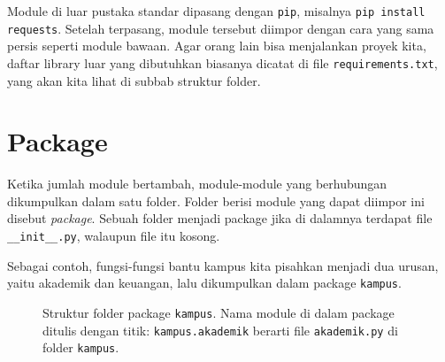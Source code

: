 Module di luar pustaka standar dipasang dengan \texttt{pip}, misalnya \texttt{pip install requests}. Setelah terpasang, module tersebut diimpor dengan cara yang sama persis seperti module bawaan. Agar orang lain bisa menjalankan proyek kita, daftar library luar yang dibutuhkan biasanya dicatat di file \texttt{requirements.txt}, yang akan kita lihat di subbab struktur folder.

\section{Package}

Ketika jumlah module bertambah, module-module yang berhubungan dikumpulkan dalam satu folder. Folder berisi module yang dapat diimpor ini disebut \emph{package}. Sebuah folder menjadi package jika di dalamnya terdapat file \texttt{\_\_init\_\_.py}, walaupun file itu kosong.

Sebagai contoh, fungsi-fungsi bantu kampus kita pisahkan menjadi dua urusan, yaitu akademik dan keuangan, lalu dikumpulkan dalam package \texttt{kampus}.

\begin{figure}[htbp]
\centering
{}
\caption{Struktur folder package \texttt{kampus}. Nama module di dalam package ditulis dengan titik: \texttt{kampus.akademik} berarti file \texttt{akademik.py} di folder \texttt{kampus}.}
\end{figure}

